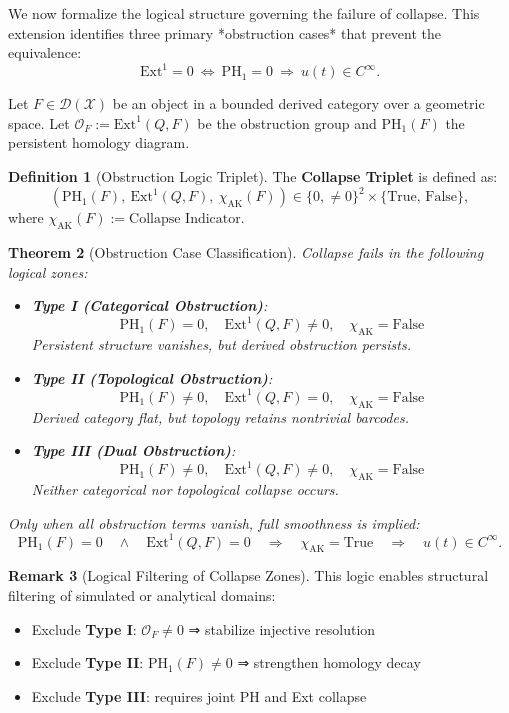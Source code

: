\documentclass[11pt]{article}
\newtheorem{theorem}{Theorem}[section]
\theoremstyle{definition}
\newtheorem{definition}[theorem]{Definition}
\newtheorem{remark}[theorem]{Remark}
\begin{document}
We now formalize the logical structure governing the failure of collapse.  
This extension identifies three primary *obstruction cases* that prevent the equivalence:
\[
\mathrm{Ext}^1 = 0 \ \Longleftrightarrow\ \mathrm{PH}_1 = 0 \ \Longrightarrow\ u(t) \in C^\infty.
\]

\vspace{1em}
Let $F \in \mathcal{D}(\mathcal{X})$ be an object in a bounded derived category over a geometric space.  
Let $\mathcal{O}_F := \mathrm{Ext}^1(Q, F)$ be the obstruction group and $\mathrm{PH}_1(F)$ the persistent homology diagram.

\begin{definition}[Obstruction Logic Triplet]
The \textbf{Collapse Triplet} is defined as:
\[
\left( \mathrm{PH}_1(F),\ \mathrm{Ext}^1(Q,F),\ \chi_{\text{AK}}(F) \right)
\in \{0, \neq 0\}^2 \times \{\text{True, False}\},
\]
where $\chi_{\text{AK}}(F) := \text{Collapse Indicator}$.
\end{definition}

\begin{theorem}[Obstruction Case Classification]
Collapse fails in the following logical zones:
\begin{itemize}
  \item \textbf{Type I (Categorical Obstruction)}:  
    \[
    \mathrm{PH}_1(F) = 0,\quad \mathrm{Ext}^1(Q,F) \ne 0,\quad \chi_{\text{AK}} = \text{False}
    \]
    Persistent structure vanishes, but derived obstruction persists.

  \item \textbf{Type II (Topological Obstruction)}:  
    \[
    \mathrm{PH}_1(F) \ne 0,\quad \mathrm{Ext}^1(Q,F) = 0,\quad \chi_{\text{AK}} = \text{False}
    \]
    Derived category flat, but topology retains nontrivial barcodes.

  \item \textbf{Type III (Dual Obstruction)}:  
    \[
    \mathrm{PH}_1(F) \ne 0,\quad \mathrm{Ext}^1(Q,F) \ne 0,\quad \chi_{\text{AK}} = \text{False}
    \]
    Neither categorical nor topological collapse occurs.
\end{itemize}
Only when all obstruction terms vanish, full smoothness is implied:
\[
\mathrm{PH}_1(F) = 0 \quad \wedge \quad \mathrm{Ext}^1(Q,F) = 0
\quad \Rightarrow \quad \chi_{\text{AK}} = \text{True} \quad \Rightarrow \quad u(t) \in C^\infty.
\]
\end{theorem}

\begin{remark}[Logical Filtering of Collapse Zones]
This logic enables structural filtering of simulated or analytical domains:
\begin{itemize}
  \item Exclude \textbf{Type I}: $\mathcal{O}_F \ne 0$ ⇒ stabilize injective resolution
  \item Exclude \textbf{Type II}: $\mathrm{PH}_1(F) \ne 0$ ⇒ strengthen homology decay
  \item Exclude \textbf{Type III}: requires joint PH and Ext collapse
\end{itemize}
\end{remark}
\end{document}
